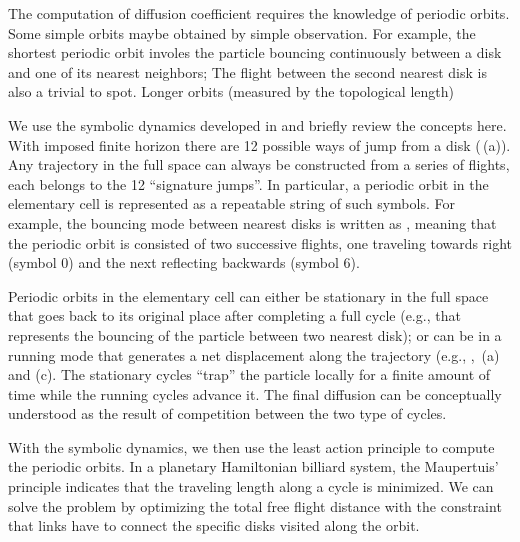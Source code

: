 


The computation of diffusion coefficient  requires
the knowledge of periodic orbits. Some simple orbits maybe obtained by
simple observation. For example, the shortest periodic orbit involes
the particle bouncing continuously between a disk and one of its
nearest neighbors; The flight between the second nearest disk is also a
trivial to spot. Longer orbits (measured by the topological length)

We use the symbolic dynamics developed in  and briefly
review the concepts here. With imposed finite horizon there are 12
possible ways of jump from a disk
(\,(a)). Any trajectory in the full
space can always be constructed from a series of flights, each belongs
to the 12 ``signature jumps''. In particular, a periodic orbit in the
elementary cell is represented as a repeatable string of such symbols.
For example, the bouncing mode between nearest disks is written as
, meaning that the periodic orbit is consisted of two
successive flights, one traveling towards right (symbol $0$) and the
next reflecting backwards (symbol $6$).

Periodic orbits in the elementary cell can either be stationary in the
full space that goes back to its original place after completing a
full cycle (e.g.,  that represents the bouncing of the
particle between two nearest disk); or can be in a running mode that
generates a net displacement along the trajectory (e.g., ,
\,(a) and (c). The stationary cycles
``trap'' the  particle locally for a finite amount of time while the
running cycles advance it. The final diffusion 
can be conceptually understood as the result of competition between
the two type of cycles.

With the symbolic dynamics, we then use the least action principle to
compute the periodic orbits. In a planetary Hamiltonian
billiard system, the Maupertuis' principle indicates that the
traveling length along a cycle is minimized. We can solve the problem
by optimizing the total free flight distance with the constraint that
links have to connect the specific disks visited along the orbit.


